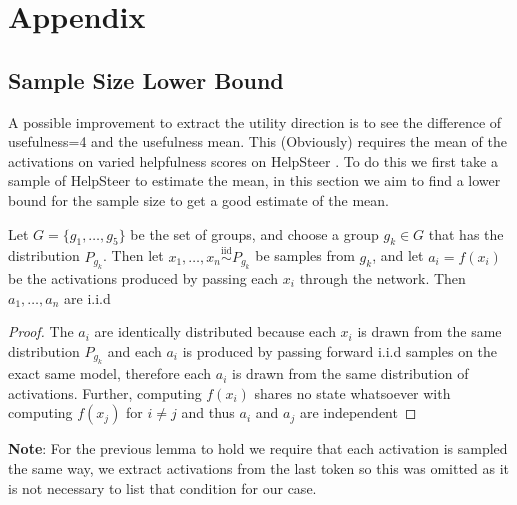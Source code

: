 \section{Appendix}
\subsection{Sample Size Lower Bound}
A possible improvement to extract the utility direction is to see the difference of usefulness=4 and the usefulness mean. 
This (Obviously) requires the mean of the activations on varied helpfulness scores on HelpSteer \citep{wang-etal-2024-helpsteer}. 
To do this we first take a sample of HelpSteer to estimate the mean, in this section we aim to find a lower bound for the sample size 
to get a good estimate of the mean.

\begin{lemma}
Let $G = \{g_1, \dots, g_5\}$ be the set of groups, and choose a group $g_k \in G$ 
that has the distribution $P_{g_k}$. Then let $x_1, \dots, x_n \stackrel{\mathrm{iid}}{\sim} P_{g_k}$ 
be samples from $g_k$, and let $a_i = f(x_i)$ be the activations produced by passing 
each $x_i$ through the network. Then $a_1, \dots, a_n$ are i.i.d
\end{lemma}

\begin{proof}
The $a_i$ are identically distributed because each $x_i$ is drawn from the same 
distribution $P_{g_k}$ and each $a_i$ is produced by passing forward i.i.d samples on the
exact same model, therefore each $a_i$ is drawn from the same distribution of activations. 
Further, computing $f(x_i)$ shares no state whatsoever with computing $f(x_j)$ for
$i \neq j$ and thus $a_i$ and $a_j$ are independent \qedhere
\end{proof}

\textbf{Note}: For the previous lemma to hold we require that each activation is sampled the same way, we extract activations from 
the last token so this was omitted as it is not necessary to list that condition for our case.

